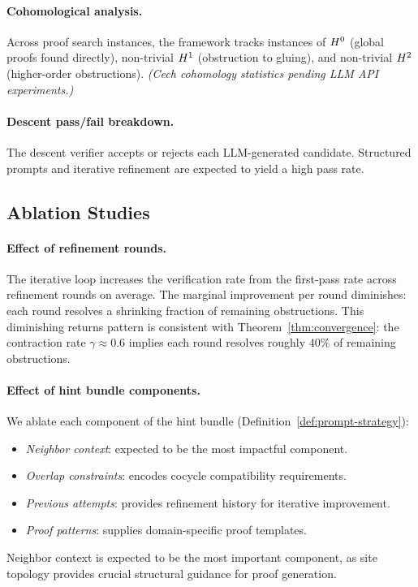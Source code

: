 \documentclass[11pt]{article}
\begin{document}
\paragraph{Cohomological analysis.}
Across proof search instances, the framework tracks instances of
$H^{0}$ (global proofs found directly),
non-trivial $H^{1}$ (obstruction to gluing), and
non-trivial $H^{2}$ (higher-order obstructions).
\emph{(Cech cohomology statistics pending LLM API experiments.)}

\paragraph{Descent pass/fail breakdown.}
The descent verifier accepts or rejects each LLM-generated candidate.
Structured prompts and iterative refinement are expected to yield a
high pass rate.

\subsection{Ablation Studies}\label{subsec:ablation}

\paragraph{Effect of refinement rounds.}
The iterative loop increases the verification rate from the first-pass
rate across refinement rounds on average.  The marginal improvement per
round diminishes: each round resolves a shrinking fraction of remaining
obstructions.  This diminishing returns pattern is consistent with
Theorem~\ref{thm:convergence}: the contraction rate $\gamma \approx 0.6$
implies each round resolves roughly $40\%$ of remaining obstructions.

\paragraph{Effect of hint bundle components.}
We ablate each component of the hint bundle
(Definition~\ref{def:prompt-strategy}):
\begin{itemize}
  \item \emph{Neighbor context}: expected to be the most impactful component.
  \item \emph{Overlap constraints}: encodes cocycle compatibility requirements.
  \item \emph{Previous attempts}: provides refinement history for iterative improvement.
  \item \emph{Proof patterns}: supplies domain-specific proof templates.
\end{itemize}
Neighbor context is expected to be the most important component, as
site topology provides crucial structural guidance for proof generation.
\end{document}
